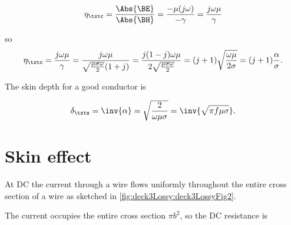 \begin{dmath}\label{eqn:uwavesLecture3:480}
\eta_\txtc = \frac{\Abs{\BE}}{\Abs{\BH}} = \frac{- \mu (j \omega)}{-\gamma} = \frac{j \omega \mu}{\gamma}
\end{dmath}

so
\begin{dmath}\label{eqn:uwavesLecture3:460}
\eta_\txtc
=
\frac{j \omega \mu}{ \gamma}
=
\frac{j \omega \mu}{
\sqrt{ \frac{ \mu \sigma \omega}{2 } } ( 1 + j )
}
=
\frac{j (1 - j ) \omega \mu}{
2 \sqrt{ \frac{ \mu \sigma \omega}{2 } }
}
=
(j + 1) \sqrt{ \frac{ \omega \mu }{ 2 \sigma} }
=
(j + 1) \frac{\alpha}{\sigma}.
\end{dmath}

The skin depth for a good conductor is

\begin{dmath}\label{eqn:uwavesLecture3:500}
\delta_\txts = \inv{\alpha} = \sqrt{\frac{2}{ \omega \mu \sigma } } = \inv{\sqrt{\pi f \mu \sigma}}.
\end{dmath}


\section{Skin effect}

At DC the current through a wire flows uniformly throughout the entire cross section of a wire as sketched in \cref{fig:deck3Lossy:deck3LossyFig2}.


The current occupies the entire cross section \( \pi b^2 \), so the DC resistance is

